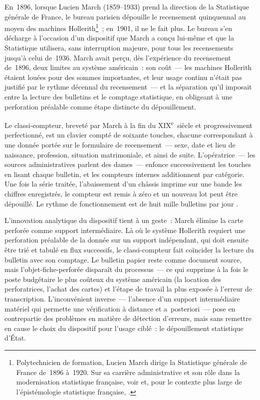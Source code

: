En~1896, lorsque Lucien March (1859--1933) prend la direction de la Statistique générale de France, le bureau parisien dépouille le recensement quinquennal au moyen des machines Hollerith\footnote{Polytechnicien de formation, Lucien March dirige la Statistique générale de France de~1896 à~1920. Sur sa carrière administrative et son rôle dans la modernisation statistique française, voir \textcite{cinquanteans_insee_1996} et, pour le contexte plus large de l'épistémologie statistique française, \textcite{desrosieres_politique_1993}.}~; en~1901, il ne le fait plus. Le bureau s'en décharge à l'occasion d'un dispositif que March a conçu lui-même et que la Statistique utilisera, sans interruption majeure, pour tous les recensements jusqu'à celui de~1936. March avait perçu, dès l'expérience du recensement de~1896, deux limites au système américain~: son coût~--- les machines Hollerith étaient louées pour des sommes importantes, et leur usage continu n'était pas justifié par le rythme décennal du recensement~--- et la séparation qu'il imposait entre la lecture des bulletins et le comptage statistique, en obligeant à une perforation préalable comme étape distincte du dépouillement.

Le classi-compteur, breveté par March à la fin du XIX\textsuperscript{e}~siècle et progressivement perfectionné, est un clavier compté de soixante touches, chacune correspondant à une donnée portée sur le formulaire de recensement~--- sexe, date et lieu de naissance, profession, situation matrimoniale, et ainsi de suite. L'opératrice~--- les sources administratives parlent des \og dames\fg{}~--- enfonce successivement les touches en lisant chaque bulletin, et les compteurs internes additionnent par catégorie. Une fois la série traitée, l'abaissement d'un châssis imprime sur une bande les chiffres enregistrés, le compteur est remis à zéro et un nouveau lot peut être dépouillé. Le rythme de fonctionnement est de huit mille bulletins par jour \parencite[ch.~7]{gardey_ecrire_2008}.

%
L'innovation analytique du dispositif tient à un geste~: March élimine la carte perforée comme support intermédiaire. Là où le système Hollerith requiert une perforation préalable de la donnée sur un support indépendant, qui doit ensuite être trié et tabulé en flux successifs, le classi-compteur fait coïncider la lecture du bulletin avec son comptage. Le bulletin papier reste comme document source, mais l'objet-fiche-perforée disparaît du processus~--- ce qui supprime à la fois le poste budgétaire le plus coûteux du système américain (la location des perforatrices, l'achat des cartes) et l'étape de travail la plus exposée à l'erreur de transcription. L'inconvénient inverse~--- l'absence d'un support intermédiaire matériel qui permette une vérification à distance et a~posteriori~--- pose en contrepartie des problèmes en matière de détection d'erreurs, mais sans remettre en cause le choix du dispositif pour l'usage ciblé~: le dépouillement statistique d'État.

